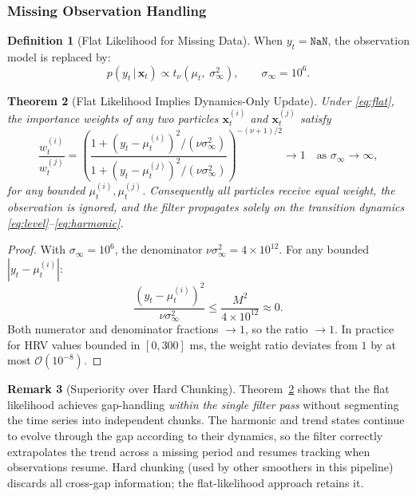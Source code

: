 \documentclass[11pt, a4paper]{article}
\theoremstyle{plain}
\newtheorem{theorem}{Theorem}[section]
\theoremstyle{definition}
\newtheorem{definition}[theorem]{Definition}
\newtheorem{remark}[theorem]{Remark}
\newcommand{\bx}{\mathbf{x}}
\newcommand{\given}{\,|\,}
\begin{document}
\subsubsection{Missing Observation Handling}

\begin{definition}[Flat Likelihood for Missing Data]
When $y_t = \texttt{NaN}$, the observation model is replaced by:
\begin{equation}
  p(y_t \given \bx_t) \propto t_\nu(\mu_t,\; \sigma_\infty^2),
  \qquad \sigma_\infty = 10^6.
  \label{eq:flat}
\end{equation}
\end{definition}

\begin{theorem}[Flat Likelihood Implies Dynamics-Only Update]\label{thm:flat}
Under \eqref{eq:flat}, the importance weights of any two particles
$\bx_t^{(i)}$ and $\bx_t^{(j)}$ satisfy
\[
  \frac{w_t^{(i)}}{w_t^{(j)}}
  = \left(
      \frac{1 + (y_t - \mu_t^{(i)})^2/(\nu\sigma_\infty^2)}
           {1 + (y_t - \mu_t^{(j)})^2/(\nu\sigma_\infty^2)}
    \right)^{-(\nu+1)/2}
  \to 1 \quad \text{as } \sigma_\infty \to \infty,
\]
for any bounded $\mu_t^{(i)}, \mu_t^{(j)}$. Consequently all particles
receive equal weight, the observation is ignored, and the filter propagates
solely on the transition dynamics \eqref{eq:level}--\eqref{eq:harmonic}.
\end{theorem}
\begin{proof}
With $\sigma_\infty = 10^6$, the denominator $\nu\sigma_\infty^2 = 4 \times 10^{12}$.
For any bounded $|y_t - \mu_t^{(i)}|$:
\[
  \frac{(y_t - \mu_t^{(i)})^2}{\nu\sigma_\infty^2} \leq \frac{M^2}{4\times 10^{12}} \approx 0.
\]
Both numerator and denominator fractions $\to 1$, so the ratio $\to 1$.
In practice for HRV values bounded in $[0, 300]$ ms, the weight ratio
deviates from $1$ by at most $\mathcal{O}(10^{-8})$.
\end{proof}

\begin{remark}[Superiority over Hard Chunking]
Theorem~\ref{thm:flat} shows that the flat likelihood achieves gap-handling
\emph{within the single filter pass} without segmenting the time series into
independent chunks. The harmonic and trend states continue to evolve through
the gap according to their dynamics, so the filter correctly extrapolates the
trend across a missing period and resumes tracking when observations resume.
Hard chunking (used by other smoothers in this pipeline) discards all
cross-gap information; the flat-likelihood approach retains it.
\end{remark}
\end{document}
